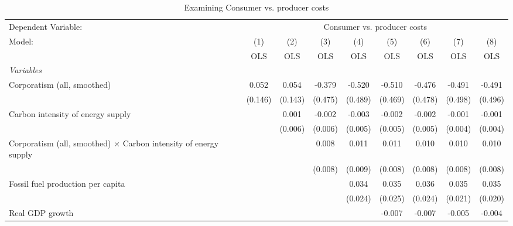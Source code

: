 
\begin{table}[htbp]
   \caption{Examining Consumer vs. producer costs}
   \centering
   \begin{tabular}{lcccccccc}
      \toprule
      Dependent Variable: & \multicolumn{8}{c}{Consumer vs. producer costs}\\
      Model:                                                                  & (1)     & (2)     & (3)     & (4)     & (5)     & (6)     & (7)     & (8)\\  
                                                                              &  OLS    & OLS     & OLS     & OLS     & OLS     & OLS     & OLS     & OLS\\  
      \midrule
      \emph{Variables}\\
      Corporatism (all, smoothed)                                             & 0.052   & 0.054   & -0.379  & -0.520  & -0.510  & -0.476  & -0.491  & -0.491\\   
                                                                              & (0.146) & (0.143) & (0.475) & (0.489) & (0.469) & (0.478) & (0.498) & (0.496)\\   
      Carbon intensity of energy supply                                       &         & 0.001   & -0.002  & -0.003  & -0.002  & -0.002  & -0.001  & -0.001\\   
                                                                              &         & (0.006) & (0.006) & (0.005) & (0.005) & (0.005) & (0.004) & (0.004)\\   
      Corporatism (all, smoothed) $\times$ Carbon intensity of energy supply  &         &         & 0.008   & 0.011   & 0.011   & 0.010   & 0.010   & 0.010\\   
                                                                              &         &         & (0.008) & (0.009) & (0.008) & (0.008) & (0.008) & (0.008)\\   
      Fossil fuel production per capita                                       &         &         &         & 0.034   & 0.035   & 0.036   & 0.035   & 0.035\\   
                                                                              &         &         &         & (0.024) & (0.025) & (0.024) & (0.021) & (0.020)\\   
      Real GDP growth                                                         &         &         &         &         & -0.007  & -0.007  & -0.005  & -0.004\\   

\end{tabular}
\end{table}
